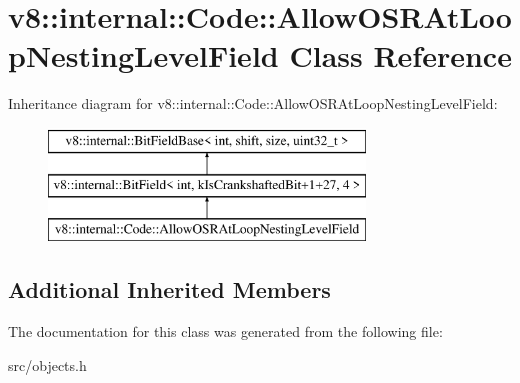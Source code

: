 \hypertarget{classv8_1_1internal_1_1_code_1_1_allow_o_s_r_at_loop_nesting_level_field}{}\section{v8\+:\+:internal\+:\+:Code\+:\+:Allow\+O\+S\+R\+At\+Loop\+Nesting\+Level\+Field Class Reference}
\label{classv8_1_1internal_1_1_code_1_1_allow_o_s_r_at_loop_nesting_level_field}
Inheritance diagram for v8\+:\+:internal\+:\+:Code\+:\+:Allow\+O\+S\+R\+At\+Loop\+Nesting\+Level\+Field\+:\begin{figure}[H]
\begin{center}
\leavevmode
\includegraphics[height=3.000000cm]{classv8_1_1internal_1_1_code_1_1_allow_o_s_r_at_loop_nesting_level_field}
\end{center}
\end{figure}
\subsection*{Additional Inherited Members}


The documentation for this class was generated from the following file\+:\begin{DoxyCompactItemize}
\item 
src/objects.\+h\end{DoxyCompactItemize}
